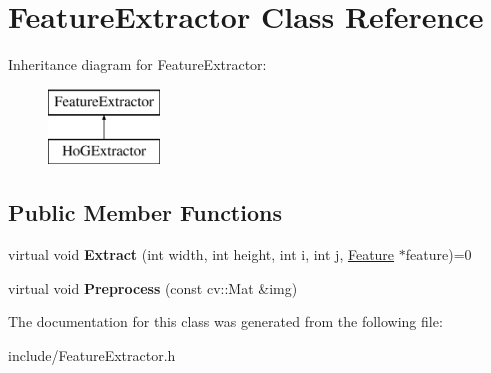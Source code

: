 \hypertarget{classFeatureExtractor}{}\section{Feature\+Extractor Class Reference}
\label{classFeatureExtractor}
Inheritance diagram for Feature\+Extractor\+:\begin{figure}[H]
\begin{center}
\leavevmode
\includegraphics[height=2.000000cm]{classFeatureExtractor}
\end{center}
\end{figure}
\subsection*{Public Member Functions}
\begin{DoxyCompactItemize}
\item 
\hypertarget{classFeatureExtractor_a2dd7d3294e8c93f8e0faa68c2233adcc}{}virtual void {\bfseries Extract} (int width, int height, int i, int j, \hyperlink{classFeature}{Feature} $\ast$feature)=0\label{classFeatureExtractor_a2dd7d3294e8c93f8e0faa68c2233adcc}

\item 
\hypertarget{classFeatureExtractor_aabb0751deb4be6180130e7c0d8d644fd}{}virtual void {\bfseries Preprocess} (const cv\+::\+Mat \&img)\label{classFeatureExtractor_aabb0751deb4be6180130e7c0d8d644fd}

\end{DoxyCompactItemize}


The documentation for this class was generated from the following file\+:\begin{DoxyCompactItemize}
\item 
include/Feature\+Extractor.\+h\end{DoxyCompactItemize}
